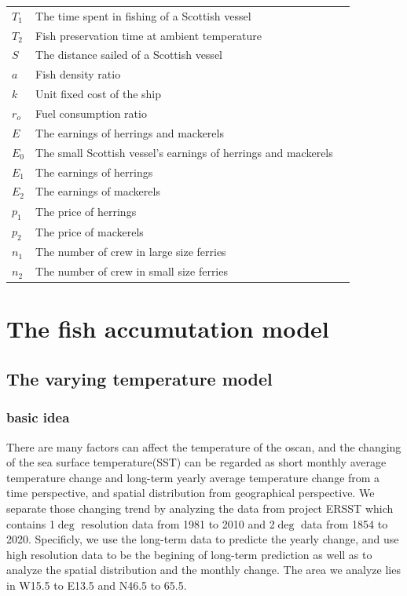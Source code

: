 \documentclass{mcmthesis}
\begin{document}
\begin{center}
\begin{longtable}{p{}p{}m{}}
$T_1$     & The time spent in fishing of a Scottish vessel   
                                                        \\
$T_2$       & Fish preservation time at ambient temperature        \\

$S$      & The distance sailed of a Scottish vessel   \\
$a$      & Fish density ratio \\
$k$      & Unit fixed cost of the ship  \\
$r_o$      & Fuel consumption ratio \\
$E$      & The earnings  of herrings and mackerels \\
$E_0$      & The small Scottish vessel's earnings  of herrings and mackerels \\
$E_1$      & The earnings  of herrings\\
$E_2$      & The earnings  of mackerels\\
$p_1$      & The price  of herrings \\
$p_2$      & The price  of mackerels  \\
$n_1$      & The number  of  crew in large size ferries \\
$n_2$      & The number  of  crew in small size ferries  \\






 \end{longtable}
 \end{center}

 \section{The fish accumutation model}
 \subsection{The varying temperature model}
 \cite{long2014fast}
  \subsubsection{basic idea}
    There are many factors can affect the temperature of the oscan, and the changing of the sea surface temperature(SST) can be 
    regarded as short monthly average temperature change and long-term yearly average temperature change from a time perspective, and spatial distribution from geographical perspective. We separate those changing trend by analyzing the data from project ERSST which contains 1$\deg$ resolution data from 1981 to 2010 and 2$\deg$ data from 1854 to 2020. Specificly, we use the long-term data to predicte the yearly change, and use high resolution data to be the begining of long-term prediction as well as to analyze the spatial distribution and the monthly change. The area we analyze lies in W15.5 to E13.5 and N46.5 to 65.5.
    
\end{document}
